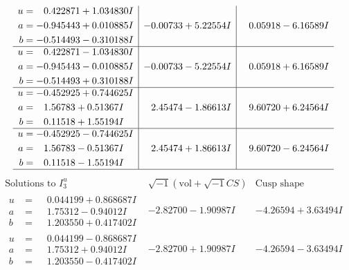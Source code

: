 \documentclass[1p]{elsarticle_modified}
\theoremstyle{definition}
\newcommand{\I}{\sqrt{-1}}
\begin{document}
$$\begin{array}{c|c|c}
\begin{aligned}
u &= \phantom{-}0.422871 + 1.034830 I \\
a &= -0.945443 + 0.010885 I \\
b &= -0.514493 - 0.310188 I\end{aligned}
 & -0.00733 + 5.22554 I & \phantom{-}0.05918 - 6.16589 I \\ \hline\begin{aligned}
u &= \phantom{-}0.422871 - 1.034830 I \\
a &= -0.945443 - 0.010885 I \\
b &= -0.514493 + 0.310188 I\end{aligned}
 & -0.00733 - 5.22554 I & \phantom{-}0.05918 + 6.16589 I \\ \hline\begin{aligned}
u &= -0.452925 + 0.744625 I \\
a &= \phantom{-}1.56783 + 0.51367 I \\
b &= \phantom{-}0.11518 + 1.55194 I\end{aligned}
 & \phantom{-}2.45474 - 1.86613 I & \phantom{-}9.60720 + 6.24564 I \\ \hline\begin{aligned}
u &= -0.452925 - 0.744625 I \\
a &= \phantom{-}1.56783 - 0.51367 I \\
b &= \phantom{-}0.11518 - 1.55194 I\end{aligned}
 & \phantom{-}2.45474 + 1.86613 I & \phantom{-}9.60720 - 6.24564 I\\
 \hline 
 \end{array}$$\newpage$$\begin{array}{c|c|c}  
\text{Solutions to }I^u_{3}& \I (\text{vol} + \sqrt{-1}CS) & \text{Cusp shape}\\
 \hline 
\begin{aligned}
u &= \phantom{-}0.044199 + 0.868687 I \\
a &= \phantom{-}1.75312 - 0.94012 I \\
b &= \phantom{-}1.203550 + 0.417402 I\end{aligned}
 & -2.82700 - 1.90987 I & -4.26594 + 3.63494 I \\ \hline\begin{aligned}
u &= \phantom{-}0.044199 - 0.868687 I \\
a &= \phantom{-}1.75312 + 0.94012 I \\
b &= \phantom{-}1.203550 - 0.417402 I\end{aligned}
 & -2.82700 + 1.90987 I & -4.26594 - 3.63494 I \\ \hline\begin{aligned}

\end{aligned}
\end{array}$$
\end{document}
